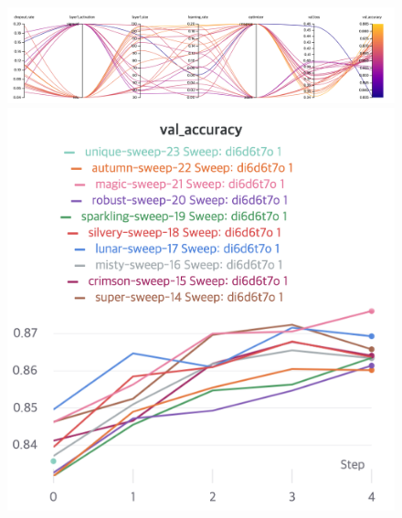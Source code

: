 \documentclass{article}
\begin{document}
\begin{figure}[!htb]
\includegraphics[width=\linewidth]{charts/Section-1-Panel-5-wi8vs86sl}
\caption{}
\endminipage\hfill
{}
\includegraphics[width=\linewidth]{charts/Section-1-Panel-6-2cy5qkhoc}
\caption{}
\endminipage
\end{figure}

\nocite{*}


\end{document}

